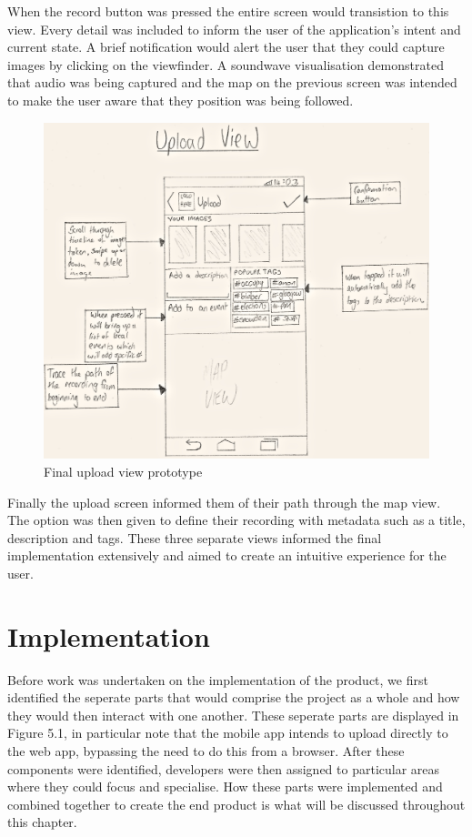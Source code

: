 \documentclass{l3proj}
\begin{document}
When the record button was pressed the entire screen would transistion to this view. Every detail was included to inform the user of the application's intent and current state. A brief notification would alert the user that they could capture images by clicking on the viewfinder. A soundwave visualisation demonstrated that audio was being captured and the map on the previous screen was intended to make the user aware that they position was being followed.

\begin{figure}[ht!]
\centering
\includegraphics[width=.85\textwidth]{images/android-upload-view.jpg}
\caption{Final upload view prototype}
\end{figure}

Finally the upload screen informed them of their path through the map view. The option was then given to define their recording with metadata such as a title, description and tags. These three separate views informed the final implementation extensively and aimed to create an intuitive experience for the user.
\chapter{Implementation}
\label{impl}

Before work was undertaken on the implementation of the product, we first identified the seperate parts that would comprise the project as a whole and how they would then interact with one another. These seperate parts are displayed in Figure 5.1, in particular note that the mobile app intends to upload directly to the web app, bypassing the need to do this from a browser. After these components were identified, developers were then assigned to particular areas where they could focus and specialise. How these parts were implemented and combined together to create the end product is what will be discussed throughout this chapter.
\end{document}
